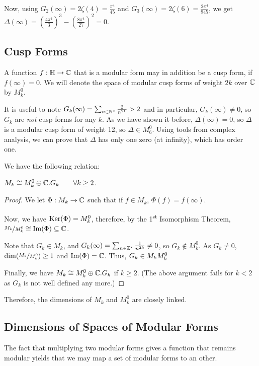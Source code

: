 Now, using $G_2(\infty) = 2\zeta(4) = \frac{\pi^4}{45}$ and $G_3(\infty) = 2\zeta(6) = \frac{2\pi^4}{945}$, we get $\varDelta(\infty) = \left( \frac{4\pi^4}{3} \right)^3 - \left( \frac{8\pi^4}{27} \right)^2 =  0$.



\subsection{Cusp Forms}
A function $f:\mathbb{H} \to \mathbb{C}$ that is a modular form may in addition be a cusp form, if $f(\infty)=0$.
We will denote the space of modular cusp forms of weight $2k$ over $\mathbb{C}$ by $M_k^0$.

It is useful to note $G_k(\infty) = \sum_{n \in \mathbb{N}^*} \frac{2}{n^{2k}} > 2$ and in particular, $G_k(\infty) \neq 0$, so $G_k$ are \textit{not} cusp forms for any $k$.
As we have shown it before, $\varDelta(\infty)=0$, so $\varDelta$ is a modular cusp form of weight 12, so $\varDelta \in M_6^0$.
Using tools from complex analysis, we can prove that $\varDelta$ has only one zero (at infinity), which has order one\cite[p.88]{CourseInArithmetic}.

We have the following relation: 
\begin{theorem}
    $M_k \cong M_k^0 \oplus \mathbb{C}.G_k \qquad \forall k \geq 2$.\cite[p.88]{CourseInArithmetic}
\end{theorem}
\begin{proof}
    We let $\Phi:M_k \to \mathbb{C}$ such that if $f \in M_k$, $\Phi(f) = f(\infty)$.
    
    Now, we have $\text{Ker}(\Phi) = M_k^0$, therefore, by the 1\textsuperscript{st} Isomorphism Theorem, $\nicefrac{M_k}{M_k^0} \cong \text{Im}(\Phi) \subseteq \mathbb{C}$.
    
    Note that $G_k \in M_k$, and $G_k(\infty) = \sum_{n \in \mathbb{Z}^*} \frac{1}{n^{2k}} \neq 0$, so $G_k \not\in M_k^0$.
    As $G_k \neq 0$, $\dim(\nicefrac{M_k}{M_k^0}) \geq 1$ and $\text{Im}(\Phi) = \mathbb{C}$.
    Thus, $G_k \in M_k\\M_k^0$
    
    Finally, we have $M_k \cong M_k^0 \oplus \mathbb{C}.G_k$ if $k \geq 2$.
    (The above argument fails for $k<2$ as $G_k$ is not well defined any more.)
\end{proof}
Therefore, the dimensions of $M_k$ and $M_k^0$ are closely linked.



\subsection{Dimensions of Spaces of Modular Forms}
The fact that multiplying two modular forms gives a function that remains modular yields that we may map a set of modular forms to an other.

